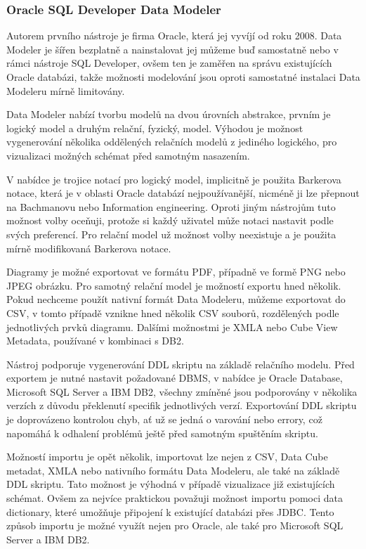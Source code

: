 \documentclass[czech,bachelor,public,dept460,male,oneside]{diploma}
\begin{document}
		\subsubsection{Oracle SQL Developer Data Modeler}
		Autorem prvního nástroje je firma Oracle, která jej vyvíjí od roku 2008. Data Modeler je šířen bezplatně a nainstalovat jej můžeme buď samostatně nebo v rámci nástroje SQL Developer, ovšem ten je zaměřen na správu existujících Oracle databázi, takže možnosti modelování jsou oproti samostatné instalaci Data Modeleru mírně limitovány.
		
		Data Modeler nabízí tvorbu modelů na dvou úrovních abstrakce, prvním je logický model a druhým relační, fyzický, model. Výhodou je možnost vygenerování několika oddělených relačních modelů z jediného logického, pro vizualizaci možných schémat před samotným nasazením. 
		
		V nabídce je trojice notací pro logický model, implicitně je použita Barkerova notace, která je v oblasti Oracle databází nejpoužívanější, nicméně ji lze přepnout na Bachmanovu nebo Information engineering. Oproti jiným nástrojům tuto možnost volby oceňuji, protože si každý uživatel může notaci nastavit podle svých preferencí. Pro relační model už možnost volby neexistuje a je použita mírně modifikovaná Barkerova notace.
		
		Diagramy je možné exportovat ve formátu PDF, případně ve formě PNG nebo JPEG obrázku. Pro samotný relační model je možností exportu hned několik. Pokud nechceme použít nativní formát Data Modeleru, můžeme exportovat do CSV, v tomto případě vznikne hned několik CSV souborů, rozdělených podle jednotlivých prvků diagramu. Dalšími možnostmi je XMLA nebo Cube View Metadata, používané v kombinaci s DB2. 
		
		Nástroj podporuje vygenerování DDL skriptu na základě relačního modelu. Před exportem je nutné nastavit požadované DBMS, v nabídce je Oracle Database, Microsoft SQL Server a IBM DB2, všechny zmíněné jsou podporovány v několika verzích z důvodu překlenutí specifik jednotlivých verzí. Exportování DDL skriptu je doprovázeno kontrolou chyb, ať už se jedná o varování nebo errory, což napomáhá k odhalení problémů ještě před samotným spuštěním skriptu.
		
		Možností importu je opět několik, importovat lze nejen z CSV, Data Cube metadat, XMLA nebo nativního formátu Data Modeleru, ale také na základě DDL skriptu. Tato možnost je výhodná v případě vizualizace již existujících schémat. Ovšem za nejvíce praktickou považuji možnost importu pomoci data dictionary, které umožňuje připojení k existující databázi přes JDBC. Tento způsob importu je možné využít nejen pro Oracle, ale také pro Microsoft SQL Server a IBM DB2.
		
\end{document}
